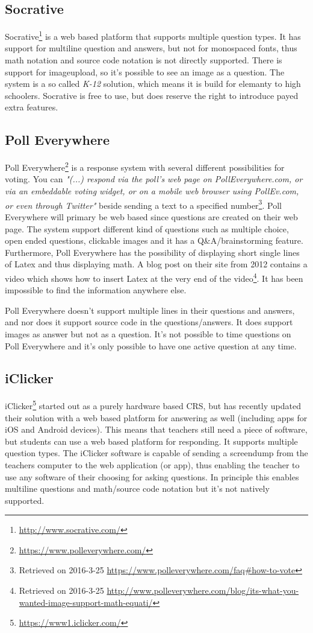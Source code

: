 \subsection*{Socrative}
Socrative\footnote{\url{http://www.socrative.com/}} is a web based platform that supports multiple question types. It has support for multiline question and answers, but not for monospaced fonts, thus math notation and source code notation is not directly supported. There is support for imageupload, so it's possible to see an image as a question. The system is a so called \emph{K-12} solution, which means it is build for elemanty to high schoolers. Socrative is free to use, but does reserve the right to introduce payed extra features.

\subsection*{Poll Everywhere}
Poll Everywhere\footnote{\url{https://www.polleverywhere.com/}} is a response system with several different possibilities for voting. You can \emph{"(...) respond via the poll's web page on PollEverywhere.com, or via an embeddable voting widget, or on a mobile web browser using PollEv.com, or even through Twitter"} beside sending a text to a specified number\footnote{Retrieved on 2016-3-25 \url{https://www.polleverywhere.com/faq\#how-to-vote}}. Poll Everywhere will primary be web based since questions are created on their web page. The system support different kind of questions such as multiple choice, open ended questions, clickable images and it has a Q\&A/brainstorming feature. Furthermore, Poll Everywhere has the possibility of displaying short single lines of Latex and thus displaying math. A blog post on their site from 2012 contains a video which shows how to insert Latex at the very end of the video\footnote{Retrieved on 2016-3-25 \url{http://www.polleverywhere.com/blog/its-what-you-wanted-image-support-math-equati/}}. It has been impossible to find the information anywhere else.

Poll Everywhere doesn't support multiple lines in their questions and answers, and nor does it support source code in the questions/answers. It does support images as answer but not as a question. It's not possible to time questions on Poll Everywhere and it's only possible to have one active question at any time. 

\subsection*{iClicker}
iClicker\footnote{\url{https://www1.iclicker.com/}} started out as a purely hardware based CRS, but has recently updated their solution with a web based platform for answering as well (including apps for iOS and Android devices). This means that teachers still need a piece of software, but students can use a web based platform for responding. It supports multiple question types. The iClicker software is capable of sending a screendump from the teachers computer to the web application (or app), thus enabling the teacher to use any software of their choosing for asking questions. In principle this enables multiline questions and math/source code notation but it's not natively supported. 


